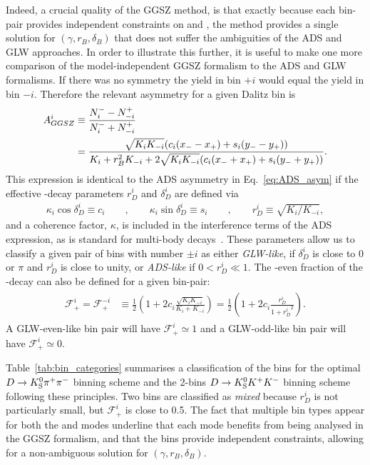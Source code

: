Indeed, a crucial quality of the GGSZ method, is that exactly because each bin-pair provides independent constraints on \xpm and \ypm, the method provides a single solution for $(\gamma, r_B, \delta_B)$ that does not suffer the ambiguities of the ADS and GLW approaches. In order to illustrate this further, it is useful to make one more comparison of the model-independent GGSZ formalism to the ADS and GLW formalisms. If there was no \CP symmetry the \Bp yield in bin $+i$ would equal the \Bm yield in bin $-i$. Therefore the relevant \CP asymmetry for a given Dalitz bin is
\begin{align}
\begin{split}
        A_{GGSZ}^i &\equiv \frac{N^-_i - N^+_{-i}}{N^-_i + N^+_{-i}} \\
    &= \frac{\sqrt{K_i K_{-i}}(c_i(x_--x_+)+s_i(y_--y_+))}{K_i+r_B^2K_{-i} + 2 \sqrt{K_i K_{-i}}(c_i(x_-+x_+)+s_i(y_-+y_+))}.
\end{split}
\end{align}
This expression is identical to the ADS asymmetry in Eq.~\eqref{eq:ADS_asym} if the effective \D-decay parameters $r_D^i$ and $\delta_D^i$ are defined via
\begin{align}
    \kappa_i\cos\delta_D^i \equiv c_i \qquad, \qquad \kappa_i\sin \delta_D^i \equiv s_i \qquad, \qquad r_D^i \equiv \sqrt{K_i/K_{-i}},
\end{align}
and a coherence factor, $\kappa$, is included in the interference terms of the ADS expression, as is standard for multi-body \D decays~\cite{}. These parameters allow us to classify a given pair of bins with number $\pm i$ as either \emph{GLW-like}, if $ \delta_D^i$ is close to $0$ or $\pi$ and $r_D^i$  is close to unity, or \emph{ADS-like} if $0<r_D^i \ll 1$. The \CP-even fraction of the \D-decay can also be defined for a given bin-pair:
\begin{align}
\begin{split}
    \mathcal F_{+}^i = \mathcal F_+^{-i} &\equiv \frac{1}{2}\left(1 + 2c_i \frac{\sqrt{K_i K_{-i}}}{K_i + K_{-i}}\right) = \frac{1}{2}\left(1 + 2c_i \frac{r_D^i}{1+{r_D^i}^2}\right).
\end{split}
\end{align}
A GLW-even-like bin pair will have $\mathcal F_{+}^i\simeq 1$ and a GLW-odd-like bin pair will have $\mathcal F_{+}^i\simeq 0$.

Table~\ref{tab:bin_categories} summarises a classification of the bins for the optimal $D\rightarrow{\ensuremath{{K}^0_{\mathrm{S}}}}{\ensuremath{{\pi}^+}}{\ensuremath{{\pi}^-}}$ binning scheme and the 2-bins ${{D}\rightarrow{\ensuremath{{K}^0_{\mathrm{S}}}}{\ensuremath{{K}^+}}{\ensuremath{{K}^-}}}$ binning scheme following these principles. Two bins are classified as \emph{mixed} because $r_D^i$ is not particularly small, but $\mathcal F_+^i$ is close to 0.5. The fact that multiple bin types appear for both the \DtoKspipi and \DtoKsKK modes underline that each mode benefits from being analysed in the GGSZ formalism, and that the bins provide independent constraints, allowing for a non-ambiguous solution for $(\gamma, r_B, \delta_B)$. 

